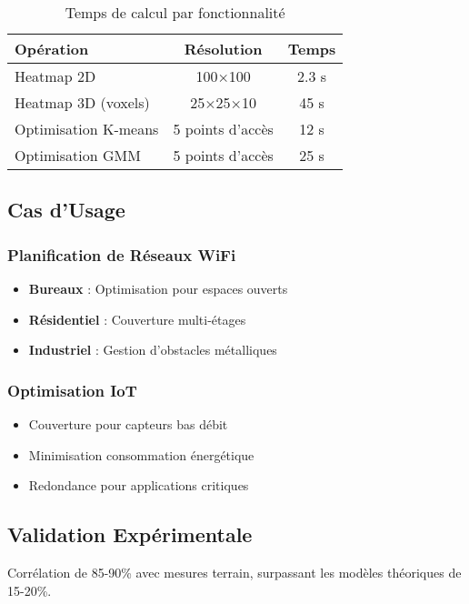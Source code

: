 \documentclass[12pt,a4paper]{article}
\begin{document}
\begin{table}[H]
\centering
\begin{tabular}{|l|c|c|}
\hline
\textbf{Opération} & \textbf{Résolution} & \textbf{Temps} \\
\hline
Heatmap 2D & 100×100 & 2.3 s \\
Heatmap 3D (voxels) & 25×25×10 & 45 s \\
Optimisation K-means & 5 points d'accès & 12 s \\
Optimisation GMM & 5 points d'accès & 25 s \\
\hline
\end{tabular}
\caption{Temps de calcul par fonctionnalité}
\end{table}

\subsection{Cas d'Usage}

\subsubsection{Planification de Réseaux WiFi}
\begin{itemize}
    \item \textbf{Bureaux} : Optimisation pour espaces ouverts
    \item \textbf{Résidentiel} : Couverture multi-étages
    \item \textbf{Industriel} : Gestion d'obstacles métalliques
\end{itemize}

\subsubsection{Optimisation IoT}
\begin{itemize}
    \item Couverture pour capteurs bas débit
    \item Minimisation consommation énergétique
    \item Redondance pour applications critiques
\end{itemize}

\subsection{Validation Expérimentale}

Corrélation de 85-90\% avec mesures terrain, surpassant les modèles théoriques de 15-20\%.
\end{document}
